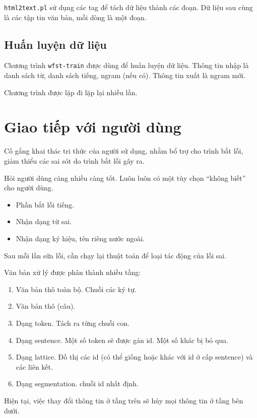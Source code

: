 \documentclass[a4paper,oneside,14pt]{extbook} %
\begin{document}
\verb#html2text.pl# sử dụng các tag để tách dữ liệu thành các đoạn. Dữ
liệu sau cùng là các tập tin văn bản, mỗi dòng là một đoạn.

\subsection{Huấn luyện dữ liệu}
\label{sub:training-data}

Chương trình \verb#wfst-train# được dùng để huấn luyện dữ liệu. Thông
tin nhập là danh sách từ, danh sách tiếng, ngram (nếu có). Thông tin
xuất là ngram mới.

Chương trình được lặp đi lặp lại nhiều lần.

\section{Giao tiếp với người dùng}
\label{sec:ui}

Cố gắng khai thác tri thức của người sử dụng, nhằm bổ trợ cho trình
bắt lỗi, giảm thiểu các sai sót do trình bắt lỗi gây ra.

Hỏi người dùng càng nhiều càng tốt. Luôn luôn có một tùy chọn ``không
biết'' cho người dùng.

\begin{itemize}
\item Phần bắt lỗi tiếng.
\item Nhận dạng từ sai.
\item Nhận dạng ký hiệu, tên riêng nước ngoài.
\end{itemize}

Sau mỗi lần sữa lỗi, cần chạy lại thuật toán để loại tác động của lỗi
sai.

Văn bản xử lý được phân thành nhiều tầng:
\begin{enumerate}
\item Văn bản thô toàn bộ. Chuỗi các ký tự.
\item Văn bản thô (câu).
\item Dạng token. Tách ra từng chuỗi con.
\item Dạng sentence. Một số token sẽ được gán id. Một số khác bị bỏ
  qua. 
\item Dạng lattice. Đồ thị các id (có thể giống hoặc khác với id ở cấp
  sentence) và các liên kết. 
\item Dạng segmentation. chuỗi id nhất định.
\end{enumerate}

Hiện tại, việc thay đổi thông tin ở tầng trên sẽ hủy mọi thông tin ở
tầng bên dưới.
\end{document}

